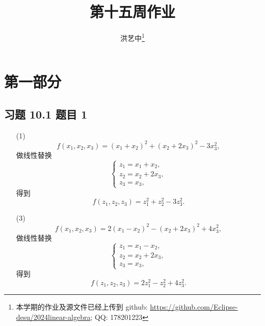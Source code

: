 \title{第十五周作业}
\author{洪艺中\thanks{本学期的作业及源文件已经上传到 {github}: \url{https://github.com/Eclipse-desu/2024linear-algebra}; QQ: 178201223}}
\maketitle
\section{第一部分}
\newcommand{\lvec}[1]{\overrightarrow{#1}}

\subsection*{ 习题 10.1 题目 1 }
\begin{solution}
\begin{enumerate}
    \item[(1)] \[
        f(x_1, x_2, x_3) = (x_1 + x_2)^2 + (x_2 + 2x_3)^2 - 3x_3^2,
    \]
    做线性替换
    \[
    \begin{cases}
        z_1 = x_1 + x_2, \\
        z_2 = x_2 + 2x_3, \\
        z_3 = x_3,
    \end{cases}
    \]
    得到
    \[
        f(z_1, z_2, z_3) = z_1^2 + z_2^2 - 3z_3^2.
    \]
    \item[(3)] \[
        f(x_1, x_2, x_3) = 2(x_1 - x_2)^2 - (x_2 + 2x_3)^2 + 4x_3^2,
    \]
    做线性替换
    \[
    \begin{cases}
        z_1 = x_1 - x_2, \\
        z_2 = x_2 + 2x_3, \\
        z_3 = x_3,
    \end{cases}
    \]
    得到
    \[
        f(z_1, z_2, z_3) = 2z_1^2 - z_2^2 + 4z_3^2.
    \]
\end{enumerate}
\end{solution}

\newpage
